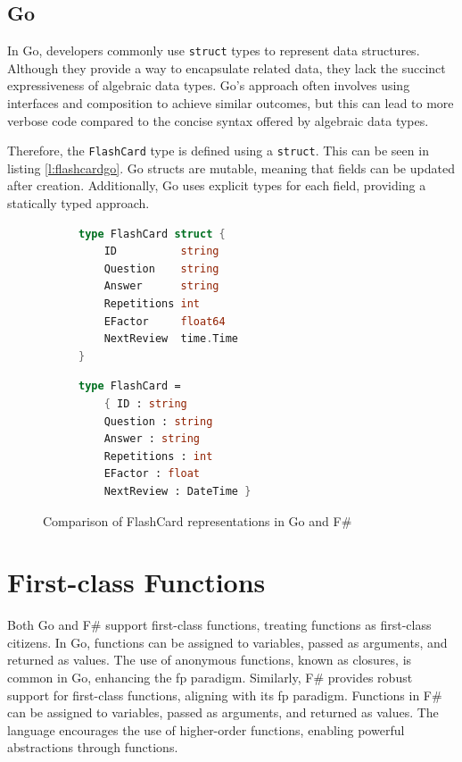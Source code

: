     \subsection*{Go}
    In Go, developers commonly use \texttt{struct} types to represent data structures. Although they provide a way to encapsulate related data, they lack the succinct expressiveness of algebraic data types. Go's approach often involves using interfaces and composition to achieve similar outcomes, but this can lead to more verbose code compared to the concise syntax offered by algebraic data types.

    Therefore, the \texttt{FlashCard} type is defined using a \texttt{struct}. This can be seen in listing \ref{l:flashcardgo}. Go structs are mutable, meaning that fields can be updated after creation. Additionally, Go uses explicit types for each field, providing a statically typed approach.

\begin{figure}[ht]
\begin{subfigure}{0.48\textwidth}
\begin{lstlisting}[language=go, firstnumber=1, caption={FlashCard representation in Go}, label=l:flashcardgo]
type FlashCard struct {
    ID          string
    Question    string
    Answer      string
    Repetitions int
    EFactor     float64
    NextReview  time.Time
}
\end{lstlisting}
\end{subfigure}\hfill
\begin{subfigure}{0.48\textwidth}
\begin{lstlisting}[language=FSharp, firstnumber=1, caption={FlashCard representation in F\#}, label=l:flashcardfsharp]
type FlashCard =
    { ID : string
    Question : string
    Answer : string
    Repetitions : int
    EFactor : float
    NextReview : DateTime }
\end{lstlisting}
\end{subfigure}
\caption{Comparison of FlashCard representations in Go and F\#}\label{fig:flashcardcomparison}
\end{figure}

    \section{First-class Functions}\label{sec:first-class-functions}
    Both Go and F\# support first-class functions, treating functions as first-class citizens. In Go, functions can be assigned to variables, passed as arguments, and returned as values. The use of anonymous functions, known as closures, is common in Go, enhancing the \ac{fp} paradigm. Similarly, F\# provides robust support for first-class functions, aligning with its \ac{fp} paradigm. Functions in F\# can be assigned to variables, passed as arguments, and returned as values. The language encourages the use of higher-order functions, enabling powerful abstractions through functions.

